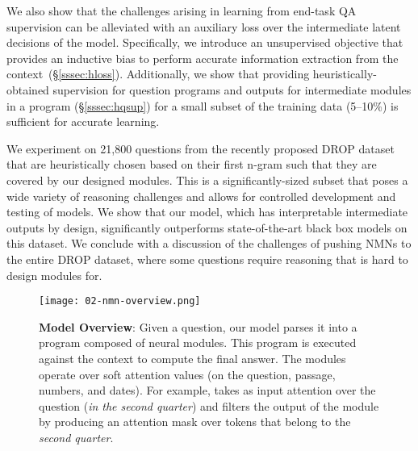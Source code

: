 \documentclass[main.tex]{subfiles}
\begin{document}
We also show that the challenges arising in learning from end-task QA supervision can be alleviated with an auxiliary loss over the intermediate latent decisions of the model.  Specifically, we introduce an unsupervised objective that provides an inductive bias to perform accurate information extraction from the context~(\S\ref{sssec:hloss}).
Additionally, we show that providing heuristically-obtained supervision for question programs and outputs for intermediate modules in a program (\S\ref{sssec:hqsup}) for a small subset of the training data (5--10\%) is sufficient for accurate learning.

We experiment on 21,800 questions from the recently proposed DROP dataset~\cite{drop-2019} that are heuristically chosen based on their first n-gram such that they are covered by our designed modules.  %
This is a significantly-sized subset that poses a wide variety of reasoning challenges and allows for controlled development and testing of models.
We show that our model, which has interpretable intermediate outputs by design, significantly outperforms state-of-the-art black box models on this dataset.
We conclude with a discussion of the challenges of pushing NMNs to the entire DROP dataset, where some questions require reasoning that is hard to design modules for.


\begin{figure}[t]
    \centering
    \texttt{[image: 02-nmn-overview.png]}
    \caption{\textbf{Model Overview}: Given a question, our model parses it into a program composed of neural modules. This program is executed against the context  to compute the final answer. The modules operate over soft attention values (on the question, passage, numbers, and dates). For example,  takes as input attention over the question (\textit{in the second quarter}) and filters the output of the  module by producing an attention mask over tokens that belong to the \textit{second quarter}.}
    \label{fig:02-nmn-overview}
\end{figure}
\end{document}
